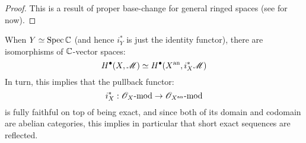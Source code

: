                 \begin{proof}
                    This is a result of proper base-change for general ringed spaces (see \cite[\href{https://stacks.math.columbia.edu/tag/09V4}{Tag 09V4}]{stacks} for now). 
                \end{proof}
            \begin{corollary} \label{coro: GAGA_cohomological_comparison}
                When $Y \simeq \operatorname{Spec} \mathbb{C}$ (and hence $i_Y^*$ is just the identity functor), there are isomorphisms of $\mathbb{C}$-vector spaces:
                    $$H^{\bullet}(X, \mathscr{M}) \simeq H^{\bullet}(X^{\mathrm{an}}, i_X^*\mathscr{M})$$
                In turn, this implies that the pullback functor:
                    $$i_X^*: \mathscr{O}_X\text{-}\mathrm{mod} \to \mathscr{O}_{X^{\mathrm{an}}}\text{-}\mathrm{mod}$$
                is fully faithful on top of being exact, and since both of its domain and codomain are abelian categories, this implies in particular that short exact sequences are reflected. 
            \end{corollary}

